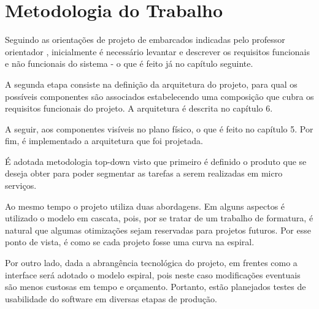 \chapter{Metodologia do Trabalho}
Seguindo as orientações de projeto de embarcados indicadas pelo professor orientador \cite{apostilaSE}, inicialmente é necessário levantar e descrever os requisitos funcionais e não funcionais do sistema - o que é feito já no capítulo seguinte.

A segunda etapa consiste na definição da arquitetura do projeto, para qual os possíveis componentes são associados estabelecendo uma composição que cubra os requisitos funcionais do projeto. A arquitetura é descrita no capítulo 6.

A seguir, aos componentes visíveis no plano físico, o que é feito no capítulo 5. Por fim, é implementado a arquitetura que foi projetada.

É adotada metodologia top-down visto que primeiro é definido o produto que se deseja obter para poder segmentar as tarefas a serem realizadas em micro serviços.

Ao mesmo tempo o projeto utiliza duas abordagens. Em alguns aspectos é utilizado o modelo em cascata, pois, por se tratar de um trabalho de formatura, é natural que algumas otimizações sejam reservadas para projetos futuros. Por esse ponto de vista, é como se cada projeto fosse uma curva na espiral.

Por outro lado, dada a abrangência tecnológica do projeto, em frentes como a interface será adotado o modelo espiral, pois neste caso modificações eventuais são menos custosas em tempo e orçamento. Portanto, estão planejados testes de usabilidade do software em diversas etapas de produção.
